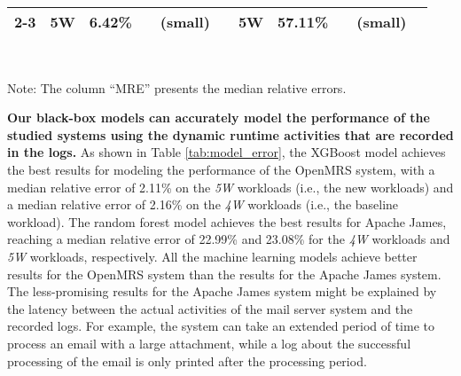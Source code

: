 \begin{landscape}
\begin{table*}[htbp]
{\begin{tabular}{|c|c|c|c|c|c|c|c|c|c|c|}
\cline{2-3}\cline{7-8}          & \multirow{1}[5]{*}{5W}    & \multirow{1}[5]{*}{6.42\%} &       & (small) &       & \multirow{1}[5]{*}{5W}    & \multirow{1}[5]{*}{57.11\%} &       & (small) &  \\[4.5mm]
    \hline
    \end{tabular}\\}
    Note: The column ``MRE'' presents the median relative errors.\hfill
  \label{tab:model_error}%
\end{table*}%
\end{landscape}

\noindent\textbf{
Our black-box models can accurately model the performance of the studied systems using the dynamic runtime activities that are recorded in the logs.} 
As shown in Table \ref{tab:model_error}, the XGBoost model achieves the best results for modeling the performance of the OpenMRS system, with a median relative error of 2.11\% on the \emph{5W} workloads (i.e., the new workloads) and a median relative error of 2.16\% on the \emph{4W} workloads (i.e., the baseline workload). 
The random forest model achieves the best results for Apache James, reaching a median relative error of 22.99\% and 23.08\% for the \emph{4W} workloads and \emph{5W} workloads, respectively. 
All the machine learning models achieve better results for the OpenMRS system than the results for the Apache James system.
The less-promising results for the Apache James system might be explained by the latency between the actual activities of the mail server system and the recorded logs. For example, the system can take an extended period of time to process an email with a large attachment, while a log about the successful processing of the email is only printed after the processing period.

